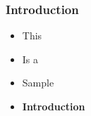 \begin{frame}[t,plain]
    \titlepage
\end{frame}

\begin{frame}
    \frametitle{Introduction}
    \begin{itemize}
        \item This
            \pause
        \item Is a
            \pause
        \item Sample
            \pause
        \item \textbf{Introduction}
    \end{itemize}
\end{frame}
